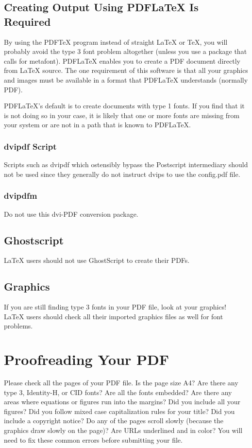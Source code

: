 \documentclass[letterpaper]{article}
\begin{document}
\subsection{Creating Output Using PDF\LaTeX{} Is Required}
By using the PDF\TeX{} program instead of straight \LaTeX{} or \TeX{}, you will probably avoid the type 3 font problem altogether (unless you use a package that calls for metafont). PDF\LaTeX{} enables you to create a PDF document directly from \LaTeX{} source. The one requirement of this software is that all your graphics and images must be available in a format that PDF\LaTeX{} understands (normally PDF).

PDF\LaTeX{}'s default is to create documents with type 1 fonts. If you find that it is not doing so in your case, it is likely that one or more fonts are missing from your system or are not in a path that is known to PDF\LaTeX{}.

\subsubsection{dvipdf Script}
Scripts such as dvipdf which ostensibly bypass the Postscript intermediary should not be used since they generally do not instruct dvips to use the config.pdf file.

\subsubsection{dvipdfm}
Do not use this dvi-PDF conversion package.

\subsection{Ghostscript}
\LaTeX{} users should not use GhostScript to create their PDFs.

\subsection{Graphics}
If you are still finding type 3 fonts in your PDF file, look at your graphics! \LaTeX{} users should check all their imported graphics files as well for font problems.

\section{Proofreading Your PDF}
Please check all the pages of your PDF file. Is the page size A4? Are there any type 3, Identity-H, or CID fonts? Are all the fonts embedded? Are there any areas where equations or figures run into the margins? Did you include all your figures? Did you follow mixed case capitalization rules for your title? Did you include a copyright notice? Do any of the pages scroll slowly (because the graphics draw slowly on the page)? Are URLs underlined and in color? You will need to fix these common errors before submitting your file. 
\end{document}
